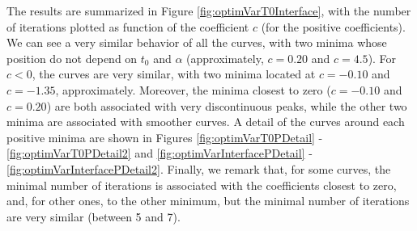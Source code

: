 \indent The results are summarized in Figure \ref{fig:optimVarT0Interface}, with the number of iterations plotted as function of the coefficient $c$ (for the positive coefficients). We can see a very similar behavior of all the curves, with two minima whose position do not depend on $t_0$ and $\alpha$ (approximately, $c = 0.20$ and $c=4.5$). For $c<0$, the curves are very similar, with two minima located at $c = -0.10$ and $c = -1.35$, approximately. Moreover, the minima closest to zero ($c=-0.10$ and $c = 0.20$) are both associated with very discontinuous peaks, while the other two minima are associated with smoother curves. A detail of the curves around each positive minima are shown in Figures \ref{fig:optimVarT0PDetail} - \ref{fig:optimVarT0PDetail2} and \ref{fig:optimVarInterfacePDetail} - \ref{fig:optimVarInterfacePDetail2}. Finally, we remark that, for some curves, the minimal number of iterations is associated with the coefficients closest to zero, and, for other ones, to the other minimum, but the minimal number of iterations are very similar (between 5 and 7).

